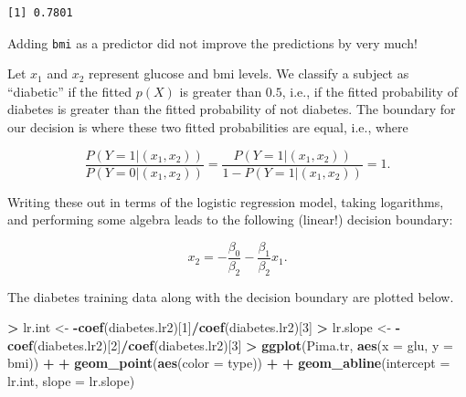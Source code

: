 \documentclass[
]{krantz}
\makeatletter
\newenvironment{Shaded}{\begin{snugshade}}{\end{snugshade}}
\newcommand{\DataTypeTok}[1]{\textcolor[rgb]{0.27,0.27,0.27}{#1}}
\newcommand{\DecValTok}[1]{\textcolor[rgb]{0.06,0.06,0.06}{#1}}
\newcommand{\FloatTok}[1]{\textcolor[rgb]{0.06,0.06,0.06}{#1}}
\newcommand{\KeywordTok}[1]{\textcolor[rgb]{0.27,0.27,0.27}{\textbf{#1}}}
\newcommand{\NormalTok}[1]{#1}
\newcommand{\OperatorTok}[1]{\textcolor[rgb]{0.43,0.43,0.43}{\textbf{#1}}}
\newcommand{\StringTok}[1]{\textcolor[rgb]{0.5,0.5,0.5}{#1}}
\newenvironment{kframe}{%
\medskip{}
\setlength{\fboxsep}{.8em}
 \def\at@end@of@kframe{}%
 \ifinner\ifhmode%
  \def\at@end@of@kframe{\end{minipage}}%
  \begin{minipage}{\columnwidth}%
 \fi\fi%
 \def\FrameCommand##1{\hskip\@totalleftmargin \hskip-\fboxsep
 \colorbox{shadecolor}{##1}\hskip-\fboxsep
     \hskip-\linewidth \hskip-\@totalleftmargin \hskip\columnwidth}%
 \MakeFramed {\advance\hsize-\width
   \@totalleftmargin\z@ \linewidth\hsize
   \@setminipage}}%
 {\par\unskip\endMakeFramed%
 \at@end@of@kframe}
\renewenvironment{Shaded}{\begin{kframe}}{\end{kframe}}
\makeatother
\begin{document}
\begin{Shaded}
\end{Shaded}

\begin{verbatim}
[1] 0.7801
\end{verbatim}

Adding \texttt{bmi} as a predictor did not improve the predictions by very much!

Let \(x_1\) and \(x_2\) represent glucose and bmi levels. We classify a subject as ``diabetic'' if the fitted \(p(X)\) is greater than \(0.5\), i.e., if the fitted probability of diabetes is greater than the fitted probability of not diabetes. The boundary for our decision is where these two fitted probabilities are equal, i.e., where

\[
\frac{P(Y = 1 | (x_1, x_2))}{P(Y = 0 | (x_1, x_2))} = \frac{P(Y = 1 | (x_1, x_2))}{1 - P(Y = 1 | (x_1, x_2))}  = 1.
\]

Writing these out in terms of the logistic regression model, taking logarithms, and performing some algebra leads to the following (linear!) decision boundary:

\[
x_2 = -\frac{\beta_0}{\beta_2} - \frac{\beta_1}{\beta_2} x_1.
\]

The diabetes training data along with the decision boundary are plotted below.

\begin{Shaded}
\begin{Highlighting}[]
\OperatorTok{\textgreater{}}\StringTok{ }\NormalTok{lr.int \textless{}{-}}\StringTok{ }\OperatorTok{{-}}\KeywordTok{coef}\NormalTok{(diabetes.lr2)[}\DecValTok{1}\NormalTok{]}\OperatorTok{/}\KeywordTok{coef}\NormalTok{(diabetes.lr2)[}\DecValTok{3}\NormalTok{]}
\OperatorTok{\textgreater{}}\StringTok{ }\NormalTok{lr.slope \textless{}{-}}\StringTok{ }\OperatorTok{{-}}\KeywordTok{coef}\NormalTok{(diabetes.lr2)[}\DecValTok{2}\NormalTok{]}\OperatorTok{/}\KeywordTok{coef}\NormalTok{(diabetes.lr2)[}\DecValTok{3}\NormalTok{]}
\OperatorTok{\textgreater{}}\StringTok{ }\KeywordTok{ggplot}\NormalTok{(Pima.tr, }\KeywordTok{aes}\NormalTok{(}\DataTypeTok{x =}\NormalTok{ glu, }\DataTypeTok{y =}\NormalTok{ bmi)) }\OperatorTok{+}\StringTok{ }
\OperatorTok{+}\StringTok{   }\KeywordTok{geom\_point}\NormalTok{(}\KeywordTok{aes}\NormalTok{(}\DataTypeTok{color =}\NormalTok{ type)) }\OperatorTok{+}\StringTok{ }
\OperatorTok{+}\StringTok{   }\KeywordTok{geom\_abline}\NormalTok{(}\DataTypeTok{intercept =}\NormalTok{ lr.int, }\DataTypeTok{slope =}\NormalTok{ lr.slope)}
\end{Highlighting}
\end{Shaded}
\end{document}
